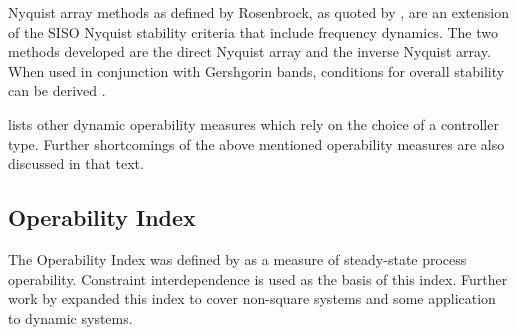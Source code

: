 Nyquist array methods as defined by Rosenbrock, as quoted by \citet[92]{skogestad}, are an extension of the SISO Nyquist stability criteria that include frequency dynamics. 
The two methods developed are the direct Nyquist array and the inverse Nyquist array. 
When used in conjunction with Gershgorin bands, conditions for overall stability can be derived \citep[440]{skogestad}.

\citet{vinsonphd} lists other dynamic operability measures which rely on the choice of a controller type. Further shortcomings of the above mentioned operability measures are also discussed in that text. 

\subsection{Operability Index}\label{sec:oi}
The Operability Index was defined by \citet{vinsonphd} as a measure of steady-state process operability. 
Constraint interdependence is used as the basis of this index. 
Further work by \citet{limaphd} expanded this index to cover non-square systems and some application to dynamic systems.

